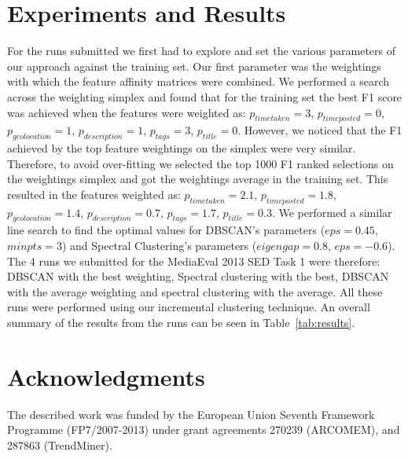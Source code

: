\documentclass{../acm_proc_article-me11_tweaked}
\begin{document}

\section{Experiments and Results} %
\label{sec:experiments}

For the runs submitted we first had to explore and set the various parameters of our approach against the training set. Our first parameter was the weightings with which the feature affinity matrices were combined. We performed a search across the weighting simplex and found that for the training set the best F1 score was achieved when the features were weighted as: $p_{timetaken}=3$, $p_{timeposted}=0$, $p_{geolocation}=1$, $p_{description}=1$, $p_{tags}=3$, $p_{title}=0$. However, we noticed that the F1 achieved by the top feature weightings on the simplex were very similar. Therefore, to avoid over-fitting we selected the top 1000 F1 ranked selections on the weightings simplex and got the weightings average in the training set. This resulted in the features weighted as: $p_{timetaken}=2.1$, $p_{timeposted}=1.8$, $p_{geolocation}=1.4$, $p_{description}=0.7$, $p_{tags}=1.7$, $p_{title}=0.3$. We performed a similar line search to find the optimal values for DBSCAN's parameters ($eps=0.45$, $minpts=3$) and Spectral Clustering's parameters ($eigengap=0.8$, $eps=-0.6$). The 4 runs we submitted for the MediaEval 2013 SED Task 1 were therefore: DBSCAN with the best weighting, Spectral clustering with the best, DBSCAN with the average weighting and spectral clustering with the average. All these runs were performed using our incremental clustering technique. An overall summary of the results from the runs can be seen in Table~\ref{tab:results}.

\section{Acknowledgments}
The described work was funded by the European Union Seventh Framework Programme (FP7/2007-2013) under grant agreements 270239 (ARCOMEM), and 287863 (TrendMiner).



\end{document}
